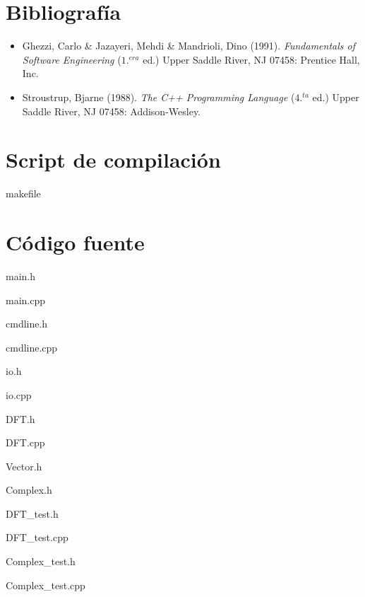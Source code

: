 \documentclass[12pt,a4paper]{report}
\begin{document}
	\section{Bibliografía}
		
		\begin{itemize}
		\item Ghezzi, Carlo \& Jazayeri, Mehdi \& Mandrioli, Dino (1991). \textit{Fundamentals of Software Engineering} ($1.^{era}$ ed.) Upper Saddle River, NJ 07458: Prentice Hall, Inc.
		\item Stroustrup, Bjarne  (1988). \textit{The C++ Programming Language}  ($4.^{ta}$ ed.) Upper Saddle River, NJ 07458: Addison-Wesley.
		\end{itemize}

	\section{Script de compilación}
	
		makefile
		
				
	\section{Código fuente}
	
		main.h
		

   		main.cpp
		

		cmdline.h
		
		
		cmdline.cpp
				
		
		io.h
		

		io.cpp
		

		DFT.h
		
		
		DFT.cpp
		
						
		Vector.h
		
		
		Complex.h
		

		DFT\_test.h
		

		DFT\_test.cpp
		

		Complex\_test.h
		

		Complex\_test.cpp
		

		
		
	
\end{document}
